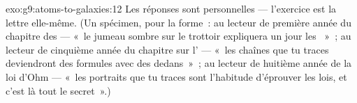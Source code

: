 \begin{solution}{exo:g9:atoms-to-galaxies:12}
Les réponses sont personnelles --- l'exercice est la lettre
elle-même. (Un spécimen, pour la forme~: au lecteur de première année
du chapitre des  --- «~le jumeau sombre sur le trottoir
expliquera un jour les ~»~; au lecteur de cinquième
année du chapitre sur l' --- «~les chaînes que tu traces
deviendront des formules avec des  dedans~»~; au lecteur de
huitième année de la loi d'Ohm --- «~les portraits que tu traces sont
l'habitude d'éprouver les lois, et c'est là tout le secret~».)
\end{solution}

